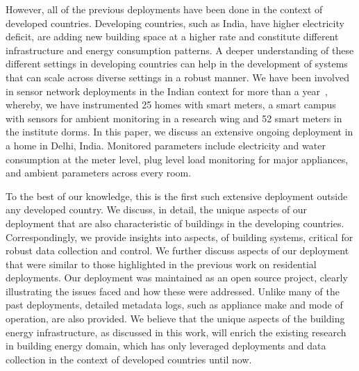 \documentclass[10pt]{sensys-proc}
\newcommand{\redcolor}[1]{\textcolor{red}{#1}}
\begin{document}
 However, all of the previous deployments have been done in the context of developed countries. Developing countries, such as India, have higher electricity deficit, are adding new building space at a higher rate and constitute different infrastructure and energy consumption patterns. A deeper understanding of these different settings in developing countries can help in the development of systems that can scale across diverse settings in a robust manner. %
We have been involved in sensor network deployments in the Indian context for more than a year~\cite{batra}, whereby, we have instrumented 25 homes with smart meters, a smart campus with sensors for ambient monitoring in a research wing and 52 smart meters in the institute dorms. In this paper, we discuss an extensive ongoing deployment in a home in Delhi, India. Monitored parameters include electricity and water consumption at the meter level, plug level load monitoring for major appliances, and ambient parameters across every room.%

 To the best of our knowledge, this is the first such extensive deployment outside any developed country. We discuss, in detail, the unique aspects of our deployment that are also characteristic of buildings in the developing countries. Correspondingly, we provide insights into aspects, of building systems, critical for robust data collection and control. We further discuss aspects of our deployment that were similar to those highlighted in the previous work on residential deployments. Our deployment was maintained as an open source project, clearly illustrating the issues faced and how these were addressed. Unlike many of the past deployments, detailed metadata logs, such as appliance make and mode of operation, are also provided. We believe that the unique aspects of the building energy infrastructure, as discussed in this work, will enrich the existing research in building energy domain, which has only leveraged deployments and data collection in the context of developed countries until now. %
\end{document}
